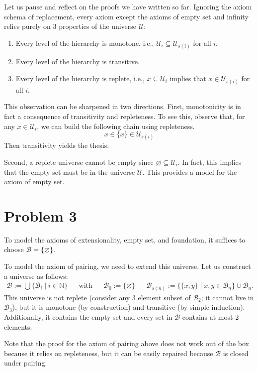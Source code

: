 \documentclass[a4paper]{article}
\newcommand{\N}{\mathbb{N}}
\newcommand{\U}{\mathcal{U}}
\newcommand{\B}{\mathcal{B}}
\begin{document}
\begin{remark}
  Let us pause and reflect on the proofs we have written so far.
  Ignoring the axiom schema of replacement, every axiom except the axioms of empty set and infinity relies purely on 3 properties of the universe $\U$:
  \begin{enumerate}
  \item Every level of the hierarchy is monotone, i.e., $\U_{i} \subseteq \U_{s(i)}$ for all $i$.
  \item Every level of the hierarchy is transitive.
  \item Every level of the hierarchy is replete, i.e., $x \subseteq \U_{i}$ implies that $x \in \U_{s(i)}$ for all $i$.
  \end{enumerate}
  This observation can be sharpened in two directions.
  First, monotonicity is in fact a consequence of transitivity and repleteness.
  To see this, observe that, for any $x \in \U_{i}$, we can build the following chain using repleteness.
  \[
    x \in \{x\} \in \U_{s(i)}
  \]
  Then transitivity yields the thesis.

  Second, a replete universe cannot be empty since $\varnothing \subseteq \U_{i}$.
  In fact, this implies that the empty set must be in the universe $\U$.
  This provides a model for the axiom of empty set.
\end{remark}

\section*{Problem 3}
To model the axioms of extensionality, empty set, and foundation, it suffices to choose $\B = \{\varnothing\}$.

To model the axiom of pairing, we need to extend this universe.
Let us construct a universe as follows:
\begin{align*}
  \B := \bigcup\{\B_{i} \mid i \in \N\} && \text{with} && \B_{0} := \{\varnothing\} && \B_{s(n)} := \{\{x,y\} \mid x,y \in \B_{n}\} \cup \B_{n}.
\end{align*}
This universe is not replete (consider any 3 element subset of $\B_{2}$; it cannot live in $\B_{3}$), but it is monotone (by construction) and transitive (by simple induction).
Additionally, it contains the empty set and every set in $\B$ contains at most 2 elements.

Note that the proof for the axiom of pairing above does not work out of the box because it relies on repleteness, but it can be easily repaired because $\B$ is closed under pairing.
\end{document}
